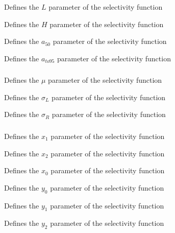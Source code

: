  {Defines the $L$ parameter of the selectivity function}

 {Defines the $H$ parameter of the selectivity function}

 {Defines the $a_{50}$ parameter of the selectivity function}

 {Defines the $a_{to95}$ parameter of the selectivity function}

\subsubsection[Double-normal]{}

 {Defines the $\mu$ parameter of the selectivity function}

 {Defines the $\sigma_L$ parameter of the selectivity function}

 {Defines the $\sigma_R$ parameter of the selectivity function}

\subsubsection[Double-exponential]{}

 {Defines the $x_1$ parameter of the selectivity function}

 {Defines the $x_2$ parameter of the selectivity function}

 {Defines the $x_0$ parameter of the selectivity function}

 {Defines the $y_0$ parameter of the selectivity function}

 {Defines the $y_1$ parameter of the selectivity function}

 {Defines the $y_2$ parameter of the selectivity function}

